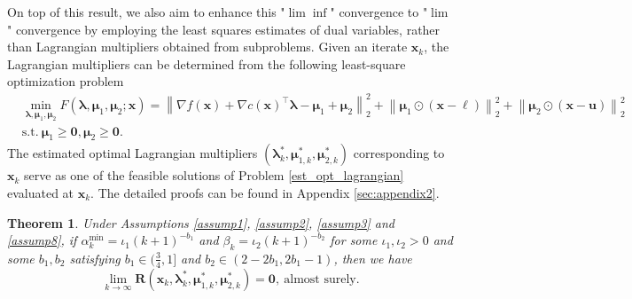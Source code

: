 \documentclass[aos]{imsart}
\numberwithin{equation}{section}
\theoremstyle{plain}
\newtheorem{theorem}{Theorem}
\begin{document}
On top of this result, we also aim to enhance this "$\lim \inf$" convergence to "$\lim$" convergence by employing the least squares estimates of dual variables, rather than Lagrangian multipliers obtained from subproblems. Given an iterate $\bm{x}_k$, the Lagrangian multipliers can be determined from the following least-square optimization problem
\begin{equation}
\label{est_opt_lagrangian}
\begin{split}
    & \min_{\bm{\lambda}, \bm{\mu}_{1}, \bm{\mu}_{2}} F(\bm{\lambda}, \bm{\mu}_{1}, \bm{\mu}_2; \bm{x}) =  \left\| \nabla f(\bm{x}) + \nabla c(\bm{x})^{\top} \bm{\lambda} - \bm{\mu}_{1} + \bm{\mu}_2 \right\|_2^2 + \left\| \bm{\mu}_{1} \odot \left( \bm{x} - \bm{\ell} \right) \right\|_2^2 + \left\| \bm{\mu}_{2} \odot \left( \bm{x} - \bm{u} \right) \right\|_2^2 \\
    & \text{s.t.}~ \bm{\mu}_{1} \geq \bm{0}, \bm{\mu}_2 \geq \bm{0}.
\end{split}
\end{equation}
The estimated optimal Lagrangian multipliers   $(\bm{\lambda}_{k}^{*}, \bm{\mu}_{1,k}^{*}, \bm{\mu}_{2,k}^{*})$ corresponding to $\bm{x}_k$ serve as one of the feasible solutions of Problem \eqref{est_opt_lagrangian} evaluated at $\bm{x}_k$. The detailed proofs can be found in Appendix \ref{sec:appendix2}.

\begin{theorem}\label{theorem_lim}
    Under Assumptions \ref{assump1}, \ref{assump2}, \ref{assump3} and \ref{assump8}, if $\alpha_k^{\text{min}} = \iota_1 (k+1)^{-b_1}$ and $\beta_k = \iota_2 (k+1)^{-b_2}$ for some $\iota_1, \iota_2 >0$ and some $b_1, b_2$ satisfying $b_1 \in (\frac{3}{4},1]$ and $b_2 \in \left( 2-2b_1,2b_1-1\right)$, then we have
     \begin{equation}
        \lim_{k \to \infty} \bm{R}(\bm{x}_{k},\bm{\lambda}_{k}^{*},\bm{\mu}_{1,k}^{*},\bm{\mu}_{2,k}^{*}) = \bm{0},~\text{almost surely}.
\end{equation}
    
\end{theorem}
\end{document}
